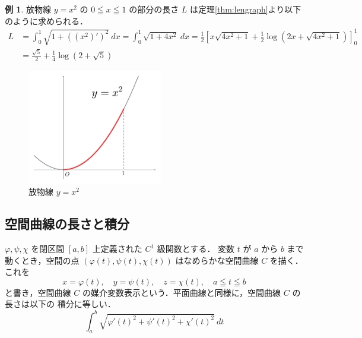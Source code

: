 \documentclass[10pt, uplatex, dvipdfmx]{jsarticle}
\theoremstyle{definition}
\newtheorem{example}[theorem]{例}
\numberwithin{equation}{section}
\begin{document}
\begin{example}
  放物線 $y=x^2$ の $0 \leqq x \leqq 1$ の部分の長さ $L$ は定理\ref{thm:lengraph}より以下のように求められる．
  \[
    \begin{aligned}
      L&=\int_{0}^{1} \sqrt{ 1 + \left( \left( x^2\right)'\right)^2}\ dx 
         = \int_{0}^{1} \sqrt{1+4x^2}\ dx
         = \frac{1}{2}\left[ x \sqrt{4x^2+1} + \frac{1}{2} \log \left( 2x+\sqrt{4x^2+1}\right)\right]_{0}^{1}\\
       & = \frac{\sqrt{5}}{2} + \frac{1}{4} \log \left( 2+\sqrt{5} \right)
    \end{aligned}
  \]
  \begin{figure}[h]
    \centering
    \includegraphics[height=5cm]{./pictures/05/parab.pdf}
    \caption{放物線 $y=x^2$}
  \end{figure}
\end{example}

\newpage

\subsection{空間曲線の長さと積分}

$\varphi, \psi, \chi$ を閉区間 $[a,b]$ 上定義された $C^1$ 級関数とする．
変数 $t$ が $a$ から $b$ まで動くとき，空間の点 $(\varphi(t), \psi(t),
\chi(t))$ はなめらかな空間曲線 $C$ を描く．これを
\[
  x=\varphi(t), \quad y=\psi(t), \quad z=\chi(t), \quad a \leqq t \leqq b
\]
と書き，空間曲線 $C$ の媒介変数表示という．平面曲線と同様に，空間曲線 $C$ の長さは以下の
積分に等しい．
\[
  \int_{a}^{b} \sqrt{ {\varphi'(t)}^2 + {\psi'(t)}^2 + {\chi'(t)}^2} \ dt
\]
\end{document}
